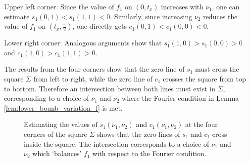 \documentclass{article}
\def\blue{blue}
\def\orange{orange}
\def\blue{black}
\def\orange{black}
\begin{document}
Upper left corner: Since the value of $f_1$ on $(0,t_x)$ increases with $\nu_1$, one can estimate $s_1(0,1) < s_1(1,1) < 0$. Similarly, since increasing $\nu_2$ reduces the value of $f_1$ on $(t_x,\frac{\pi}{2})$, one directly gets $c_1(0,1) < c_1(0,0) < 0$.

Lower right corner: Analogous arguments show that $s_1(1,0) > s_1(0,0) > 0$ and $c_1(1,0) > c_1(1,1) > 0$.

The results from the four corners show that the zero line of $s_1$ must cross the square $\Sigma$ from left to right, while the zero line of $c_1$ crosses the square from top to bottom. Therefore an intersection between both lines must exist in $\Sigma$, corresponding to a choice of $\nu_1$ and $\nu_2$ where the Fourier condition in Lemma \ref{lem:lower_bounb_variation_f} is met.

\begin{figure}
    \centering
{}

    \caption{Estimating the values of $s_1(\nu_1,\nu_2)$ and $c_1(\nu_1,\nu_2)$ at the four corners of the square $\Sigma$ shows that the zero lines of $s_1$ and $c_1$ cross inside the square. The intersection corresponds to a choice of $\nu_1$ and $\nu_2$ which `balances' $f_1$ with respect to the Fourier condition.}
    \label{fig:plot_square}
\end{figure} 
\end{document}
